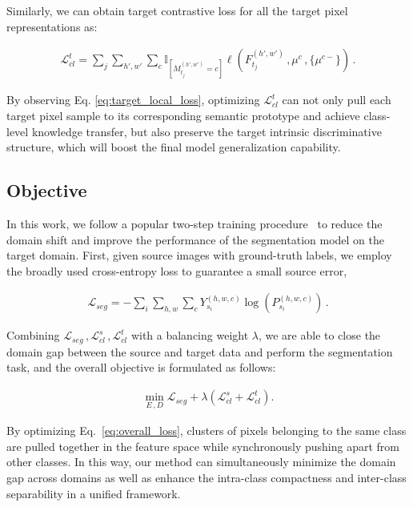 \documentclass[runningheads]{llncs}
\newcommand{\Lm}{\mathcal{L}}
\begin{document}
Similarly, we can obtain target contrastive loss for all the target pixel representations as:
 \begin{small}
    \begin{align}
        \Lm_{cl}^t = \sum_j\sum_{h',w'} \sum_{c} \mathbb{I}_{[M_{t_j}^{(h',w')}=c]} \ell({F_{t_j} ^{(h',w')}\,,\mu^{c}\,,\{\mu^{c-}\}})\,.
        \label{eq:target_local_loss}
    \end{align}
\end{small}By observing Eq. \eqref{eq:target_local_loss}, optimizing $\Lm_{cl}^t$ can not only pull each target pixel sample to its corresponding semantic prototype and achieve class-level knowledge transfer, but also preserve the target intrinsic discriminative structure, which will boost the final model generalization capability.



\subsection{Objective}
In this work, we follow a popular two-step training procedure~\cite{du2019ssf-dan,pan2020unsupervised,wang2020class,wang2020differential,zhang2019category} to reduce the domain shift and improve the performance of the segmentation model on the target domain. First, given source images with ground-truth labels, we employ the broadly used cross-entropy loss to guarantee a small source error,
 \begin{small}
    \begin{align}
        \Lm_{seg} = -\sum_i \sum_{h,w} \sum_{c} Y_{s_i}^{(h,w,c)} \log\left(P_{s_i}^{(h,w,c)}\right)\,.
        \label{eq:segmentation_loss}
    \end{align} 
\end{small}Combining $\Lm_{seg}\,,\Lm_{cl}^s\,,\Lm_{cl}^t$ with a balancing weight $\lambda$, we are able to close the domain gap between the source and target data and perform the segmentation task, and the overall objective is formulated as follows:
 \begin{small}
\begin{align}
    \mathop{\min}\limits_{E\,,D} \Lm_{seg} + \lambda (\Lm_{cl}^s + \Lm_{cl}^t).
    \label{eq:overall_loss}
\end{align}
\end{small}By optimizing Eq.~\eqref{eq:overall_loss}, clusters of pixels belonging to the same class are pulled together in the feature space while synchronously pushing apart from other classes. In this way, our method can simultaneously minimize the domain gap across domains as well as enhance the intra-class compactness and inter-class separability in a unified framework.
\end{document}
